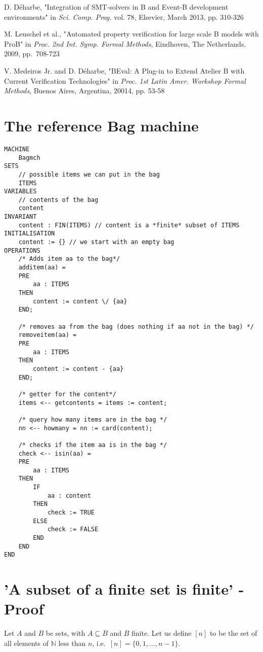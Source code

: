 \documentclass[11pt,journal]{IEEEtran}
\begin{document}
\begin{thebibliography}{2}
		D. D\'{e}harbe, "Integration of SMT-solvers in B and Event-B development environments" in \emph{Sci. Comp. Prog.} vol. 78, Elsevier, March 2013, pp. 310-326
		
		M. Leuschel et al., "Automated property verification for large scale B models with ProB" in \emph{Proc. 2nd Int. Symp. Formal Methods}, Eindhoven, The Netherlands. 2009, pp.~708-723
		
		V. Medeiros Jr. and D. D\'{e}harbe, "BEval: A Plug-in to Extend Atelier B with Current Verification Technologies" in \emph{Proc. 1st Latin Amer. Workshop Formal Methods}, Buenos Aires, Argentina, 20014, pp. 53-58
		
		
		
		

		
	\end{thebibliography}
	

	\onecolumn
	\appendices
	\section{The reference Bag machine}
	\begin{lstlisting}
MACHINE
	Bagmch
SETS
	// possible items we can put in the bag
	ITEMS
VARIABLES
	// contents of the bag
	content
INVARIANT
	content : FIN(ITEMS) // content is a *finite* subset of ITEMS
INITIALISATION
	content := {} // we start with an empty bag
OPERATIONS
	/* Adds item aa to the bag*/
	additem(aa) =
	PRE
		aa : ITEMS
	THEN
		content := content \/ {aa}
	END;

	/* removes aa from the bag (does nothing if aa not in the bag) */
	removeitem(aa) =
	PRE
		aa : ITEMS
	THEN
		content := content - {aa}
	END;

	/* getter for the content*/
	items <-- getcontents = items := content;

	/* query how many items are in the bag */
	nn <-- howmany = nn := card(content);

	/* checks if the item aa is in the bag */
	check <-- isin(aa) = 
	PRE
		aa : ITEMS
	THEN
		IF 
			aa : content
		THEN
			check := TRUE
		ELSE
			check := FALSE
		END
	END
END
\end{lstlisting}
\pagebreak
\section{'A subset of a finite set is finite' - Proof}
Let $A$ and $B$ be sets, with $A \subseteq B$ and $B$ finite. Let us define $[n]$ to be the set of all elements of $\mathbb{N}$ less than $n$, i.e.~$[n] = \{0,1,...,n-1\}$.
\end{document}
